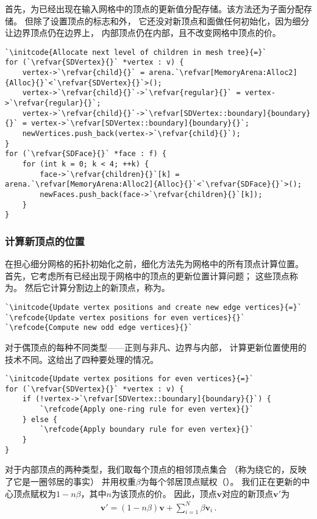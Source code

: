 首先，为已经出现在输入网格中的顶点的更新值分配存储。该方法还为子面分配存储。
但除了设置顶点的标志和外，
它还没对新顶点和面做任何初始化，因为细分让边界顶点仍在边界上，
内部顶点仍在内部，且不改变网格中顶点的价。
\begin{lstlisting}
`\initcode{Allocate next level of children in mesh tree}{=}`
for (`\refvar{SDVertex}{}` *vertex : v) {
    vertex->`\refvar{child}{}` = arena.`\refvar[MemoryArena:Alloc2]{Alloc}{}`<`\refvar{SDVertex}{}`>();
    vertex->`\refvar{child}{}`->`\refvar{regular}{}` = vertex->`\refvar{regular}{}`;
    vertex->`\refvar{child}{}`->`\refvar[SDVertex::boundary]{boundary}{}` = vertex->`\refvar[SDVertex::boundary]{boundary}{}`;
    newVertices.push_back(vertex->`\refvar{child}{}`);
}
for (`\refvar{SDFace}{}` *face : f) {
    for (int k = 0; k < 4; ++k) {
        face->`\refvar{children}{}`[k] = arena.`\refvar[MemoryArena:Alloc2]{Alloc}{}`<`\refvar{SDFace}{}`>();
        newFaces.push_back(face->`\refvar{children}{}`[k]);
    }
}
\end{lstlisting}

\subsubsection*{计算新顶点的位置}
在担心细分网格的拓扑初始化之前，细化方法先为网格中的所有顶点计算位置。
首先，它考虑所有已经出现于网格中的顶点的更新位置计算问题；
这些顶点称为。
然后它计算分割边上的新顶点，称为。
\begin{lstlisting}
`\initcode{Update vertex positions and create new edge vertices}{=}`
`\refcode{Update vertex positions for even vertices}{}`
`\refcode{Compute new odd edge vertices}{}`
\end{lstlisting}

对于偶顶点的每种不同类型——正则与非凡、边界与内部，
计算更新位置使用的技术不同。这给出了四种要处理的情况。
\begin{lstlisting}
`\initcode{Update vertex positions for even vertices}{=}`
for (`\refvar{SDVertex}{}` *vertex : v) {
    if (!vertex->`\refvar[SDVertex::boundary]{boundary}{}`) {
        `\refcode{Apply one-ring rule for even vertex}{}`
    } else {
        `\refcode{Apply boundary rule for even vertex}{}`
    }
}
\end{lstlisting}

对于内部顶点的两种类型，我们取每个顶点的相邻顶点集合
（称为绕它的，反映了它是一圈邻居的事实）
并用权重$\beta$为每个邻居顶点赋权（）。
我们正在更新的中心顶点赋权为$1-n\beta$，其中$n$为该顶点的价。
因此，顶点$\bm v$对应的新顶点$\bm v'$为
\begin{align*}
    \bm v'=(1-n\beta)\bm v+\sum\limits_{i=1}^{N}{\beta \bm v_i}\, .
\end{align*}

